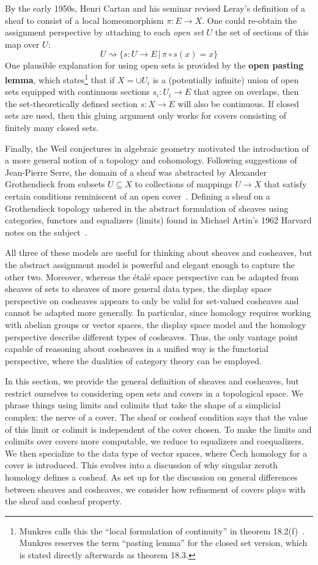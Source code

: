 By the early 1950s, Henri Cartan and his seminar revised Leray's definition of a sheaf to consist of a local homeomorphism $\pi:E\to X$. One could re-obtain the assignment perspective by attaching to each \emph{open set} $U$ the set of sections of this map over $U$: 
\[
	U \rightsquigarrow \{s:U\to E\, |\, \pi\circ s(x)=x\}
\]
One plausible explanation for using open sets is provided by the \textbf{open pasting lemma}, which states\footnote{Munkres calls this the ``local formulation of continuity'' in theorem 18.2(f)~\cite{munkres}. Munkres reserves the term ``pasting lemma'' for the closed set version, which is stated directly afterwards as theorem 18.3.} that if $X=\cup U_i$ is a (potentially infinite) union of open sets equipped with continuous sections $s_i:U_i\to E$ that agree on overlaps, then the set-theoretically defined section $s:X\to E$ will also be continuous. If closed sets are used, then this gluing argument only works for covers consisting of finitely many closed sets.

Finally, the Weil conjectures in algebraic geometry motivated the introduction of a more general notion of a topology and cohomology. Following suggestions of Jean-Pierre Serre, the domain of a sheaf was abstracted by Alexander Grothendieck from subsets $U\subseteq X$ to collections of mappings $U\to X$ that satisfy certain conditions reminiscent of an open cover~\cite{mm-topos}. Defining a sheaf on a Grothendieck topology ushered in the abstract formulation of sheaves using categories, functors and equalizers (limits) found in Michael Artin's 1962 Harvard notes on the subject~\cite{artin-gt}.

All three of these models are useful for thinking about sheaves and cosheaves, but the abstract assignment model is powerful and elegant enough to capture the other two. Moreover, whereas the \'etal\'e space perspective can be adapted from sheaves of sets to sheaves of more general data types, the display space perspective on cosheaves appears to only be valid for set-valued cosheaves and cannot be adapted more generally. In particular, since homology requires working with abelian groups or vector spaces, the display space model and the homology perspective describe different types of cosheaves. Thus, the only vantage point capable of reasoning about cosheaves in a unified way is the functorial perspective, where the dualities of category theory can be employed.

In this section, we provide the general definition of sheaves and cosheaves, but restrict ourselves to considering open sets and covers in a topological space. We phrase things using limits and colimits that take the shape of a simplicial complex: the nerve of a cover. The sheaf or cosheaf condition says that the value of this limit or colimit is independent of the cover chosen. To make the limits and colimits over covers more computable, we reduce to equalizers and coequalizers. We then specialize to the data type of vector spaces, where \v{C}ech homology for a cover is introduced. This evolves into a discussion of why singular zeroth homology defines a cosheaf. As set up for the discussion on general differences between sheaves and cosheaves, we consider how refinement of covers plays with the sheaf and cosheaf property.

